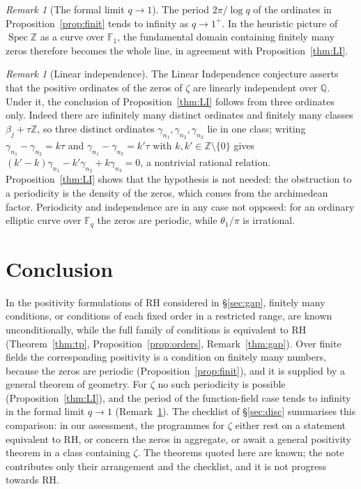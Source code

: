 \documentclass[11pt]{amsart}
\theoremstyle{definition}
\theoremstyle{remark}
\newtheorem{remark}[theorem]{Remark}
\newcommand{\bbZ}{\mathbb{Z}}
\newcommand{\bbQ}{\mathbb{Q}}
\newcommand{\bbF}{\mathbb{F}}
\begin{document}
\begin{remark}[The formal limit $q\to1$]\label{cor:degen}
The period $2\pi/\log q$ of the ordinates in Proposition~\ref{prop:finit}
tends to infinity as $q\to1^+$. In the heuristic picture of $\operatorname{Spec}\bbZ$ as a curve
over $\bbF_1$, the fundamental domain containing finitely many zeros therefore
becomes the whole line, in agreement with Proposition~\ref{thm:LI}.
\end{remark}

\begin{remark}[Linear independence]
The Linear Independence conjecture \cite{Ingham42} asserts that the positive
ordinates of the zeros of $\zeta$ are linearly independent over $\bbQ$. Under
it, the conclusion of Proposition~\ref{thm:LI} follows from three ordinates
only. Indeed there are infinitely many distinct ordinates and finitely many
classes $\beta_j+\tau\bbZ$, so three distinct ordinates
$\gamma_{n_1},\gamma_{n_2},\gamma_{n_3}$ lie in one class; writing
$\gamma_{n_1}-\gamma_{n_2}=k\tau$ and $\gamma_{n_1}-\gamma_{n_3}=k'\tau$ with
$k,k'\in\bbZ\setminus\{0\}$ gives
$(k'-k)\gamma_{n_1}-k'\gamma_{n_2}+k\gamma_{n_3}=0$, a nontrivial rational
relation. Proposition~\ref{thm:LI} shows that the hypothesis is not needed:
the obstruction to a periodicity is the density of the zeros, which comes
from the archimedean factor. Periodicity and independence are in any case not
opposed: for an ordinary elliptic curve over $\bbF_q$ the zeros are periodic,
while $\theta_1/\pi$ is irrational.
\end{remark}

\section{Conclusion}
In the positivity formulations of RH considered in \S\ref{sec:gap}, finitely
many conditions, or conditions of each fixed order in a restricted range, are
known unconditionally, while the full family of conditions is equivalent to
RH (Theorem~\ref{thm:tp}, Proposition~\ref{prop:orders},
Remark~\ref{thm:gap}). Over finite fields the corresponding positivity is a
condition on finitely many numbers, because the zeros are periodic
(Proposition~\ref{prop:finit}), and it is supplied by a general theorem of
geometry. For $\zeta$ no such periodicity is possible
(Proposition~\ref{thm:LI}), and the period of the function-field case tends
to infinity in the formal limit $q\to1$ (Remark~\ref{cor:degen}). The
checklist of \S\ref{sec:disc} summarises this comparison: in our assessment,
the programmes for $\zeta$ either rest on a statement equivalent to RH, or
concern the zeros in aggregate, or await a general positivity theorem in a
class containing $\zeta$. The theorems quoted here are known; the note
contributes only their arrangement and the checklist, and it is not progress
towards RH.
\end{document}
